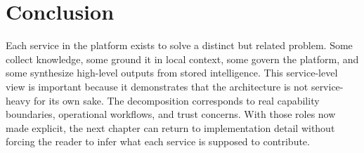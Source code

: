 \section*{Conclusion}
Each service in the platform exists to solve a distinct but related problem. Some collect knowledge, some ground it in local context, some govern the platform, and some synthesize high-level outputs from stored intelligence. This service-level view is important because it demonstrates that the architecture is not service-heavy for its own sake. The decomposition corresponds to real capability boundaries, operational workflows, and trust concerns. With those roles now made explicit, the next chapter can return to implementation detail without forcing the reader to infer what each service is supposed to contribute.
